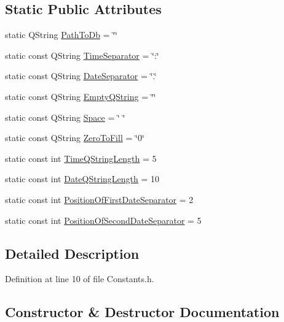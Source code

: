 \subsection*{Static Public Attributes}
\begin{DoxyCompactItemize}
\item 
static Q\+String \hyperlink{classConstants_a2a8fc008322275c6dfbc1f18a781c405}{Path\+To\+Db} = \char`\"{}\char`\"{}
\item 
static const Q\+String \hyperlink{classConstants_aa6a4e4e111634badc8b8aeba9df024ce}{Time\+Separator} = \char`\"{}\+:\char`\"{}
\item 
static const Q\+String \hyperlink{classConstants_a1b884c97c8f0c86fa5f8e050e38deca4}{Date\+Separator} = \char`\"{}.\char`\"{}
\item 
static const Q\+String \hyperlink{classConstants_a60b54ff297949426391e55991f80ccf2}{Empty\+Q\+String} = \char`\"{}\char`\"{}
\item 
static const Q\+String \hyperlink{classConstants_ade4aef58a5c7280c4f0bd40ba7b30f3c}{Space} = \char`\"{} \char`\"{}
\item 
static const Q\+String \hyperlink{classConstants_ace4bddf4b2dc0e05c8fec643238531a9}{Zero\+To\+Fill} = \char`\"{}0\char`\"{}
\item 
static const int \hyperlink{classConstants_a577e140cbb46e0fe143af8c18c29cee1}{Time\+Q\+String\+Length} = 5
\item 
static const int \hyperlink{classConstants_ae5b9b8df2388680fdacc61f9c247307d}{Date\+Q\+String\+Length} = 10
\item 
static const int \hyperlink{classConstants_aeade44a42999a2037171cc8b04031edb}{Position\+Of\+First\+Date\+Separator} = 2
\item 
static const int \hyperlink{classConstants_a6d9e83adc428b25381bc25b2e38843ea}{Position\+Of\+Second\+Date\+Separator} = 5
\end{DoxyCompactItemize}


\subsection{Detailed Description}


Definition at line 10 of file Constants.\+h.



\subsection{Constructor \& Destructor Documentation}
\hypertarget{classConstants_af395b3c1d6f0577f4880a21a257aa1db}{}\label{classConstants_af395b3c1d6f0577f4880a21a257aa1db} 
